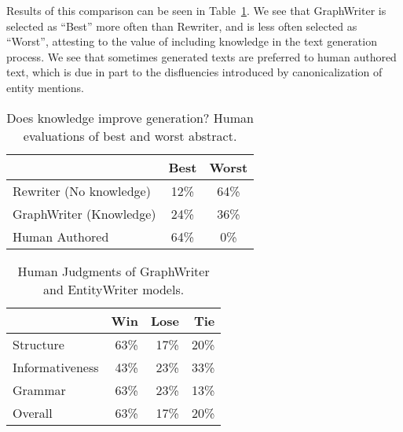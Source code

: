 \documentclass[11pt,a4paper]{article}
\begin{document}
Results of this comparison can be seen in Table~\ref{tab:know}. 
We see that GraphWriter is selected as ``Best'' more often than Rewriter, and is less often selected as ``Worst'', attesting to the value of including knowledge in the text generation process.
We see that sometimes generated texts are preferred to human authored text, which is due in part to the disfluencies introduced by canonicalization of entity mentions. 

\begin{table}
\begin{small}
\begin{center}
\begin{tabular}{lcc}
     & Best & Worst\\ \hline
    Rewriter (No knowledge) & 12\% & 64\%\\
    GraphWriter (Knowledge) & 24\% & 36\% \\
    Human Authored & 64\% & 0\% \\ \hline
\end{tabular}
\caption{Does knowledge improve generation? Human evaluations of best and worst abstract.}
\label{tab:know}
\end{center}
\end{small}
\end{table}
\begin{table}
\begin{small}
\begin{center}
\begin{tabular}{lrrr}
     & Win & Lose & Tie \\ \hline
    Structure  & 63\%  & 17\% & 20\%  \\
    Informativeness & 43\% & 23\% & 33\%   \\
    Grammar & 63\% & 23\% & 13\% \\ 
    Overall &  63\%  & 17\% & 20\% \\ \hline
\end{tabular}
\caption{Human Judgments of GraphWriter and EntityWriter models.}
\label{tab:VsEnt}
\end{center}
\end{small}
\end{table}
\end{document}
